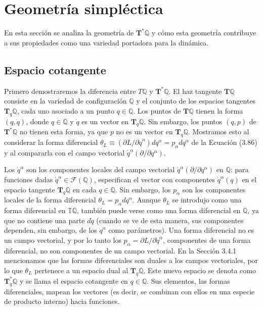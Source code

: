\section{Geometría simpléctica}

En esta sección se analiza la geometría de 
$\mathbf{T}^{*} \mathbb{Q}$ y cómo esta geometría contribuye a sus propiedades como una variedad portadora para la dinámica.

\subsection{Espacio cotangente}

Primero demostraremos la diferencia entre \( T \mathbb{Q} \) y \( \mathbf{T}^{*} \mathbb{Q} \). El haz tangente \( \mathbf{T} \mathbb{Q} \) consiste en la variedad de configuración \( \mathbb{Q} \) y el conjunto de los espacios tangentes \( \mathbf{T}_{q} \mathbb{Q} \), cada uno asociado a un punto \( q \in \mathbb{Q} \). Los puntos de \( \mathbf{T} \mathbb{Q} \) tienen la forma \( (q, \dot{q}) \), donde \( q \in \mathbb{Q} \) y \( \dot{q} \) es un vector en \( \mathbf{T}_{q} \mathbb{Q} \). Sin embargo, los puntos \( (q, p) \) de \( \mathbf{T}^{*} \mathbb{Q} \) no tienen esta forma, ya que \( p \) no es un vector en \( \mathbf{T}_{q} \mathbb{Q} \). Mostramos esto al considerar la forma diferencial \( \theta_{L} \equiv \left(\partial L / \partial \dot{q}^{\alpha}\right) d q^{\alpha} = p_{\alpha} d q^{\alpha} \) de la Ecuación (3.86) y al compararla con el campo vectorial \( \dot{q}^{\alpha}\left(\partial / \partial q^{\alpha}\right) \).

Los \( \dot{q}^{\alpha} \) son los componentes locales del campo vectorial \( \dot{q}^{\alpha}\left(\partial / \partial q^{\alpha}\right) \) en \( \mathbb{Q} \): para funciones dadas \( \dot{q}^{\alpha} \in \mathcal{F}(\mathbb{Q}) \), especifican el vector con componentes \( \dot{q}^{\alpha}(q) \) en el espacio tangente \( \mathbf{T}_{q} \mathbb{Q} \) en cada \( q \in \mathbb{Q} \). Sin embargo, los \( p_{\alpha} \) son los componentes locales de la forma diferencial \( \theta_{L} = p_{\alpha} d q^{\alpha} \). Aunque \( \theta_{L} \) se introdujo como una forma diferencial en \( \mathbb{T} \mathbb{Q} \), también puede verse como una forma diferencial en \( \mathbb{Q} \), ya que no contiene una parte \( d \dot{q} \) (cuando se ve de esta manera, sus componentes dependen, sin embargo, de los \( \dot{q}^{\alpha} \) como parámetros). Una forma diferencial no es un campo vectorial, y por lo tanto los \( p_{\alpha} = \partial L / \partial \dot{q}^{\alpha} \), componentes de una forma diferencial, no son componentes de un campo vectorial. En la Sección 3.4.1 mencionamos que las formas diferenciales son duales a los campos vectoriales, por lo que \( \theta_{L} \) pertenece a un espacio dual al \( \mathbf{T}_{q} \mathbb{Q} \). Este nuevo espacio se denota como \( \mathbf{T}_{q}^{*} \mathbb{Q} \) y se llama el espacio cotangente en \( q \in \mathbb{Q} \). Sus elementos, las formas diferenciales, mapean los vectores (es decir, se combinan con ellos en una especie de producto interno) hacia funciones.

